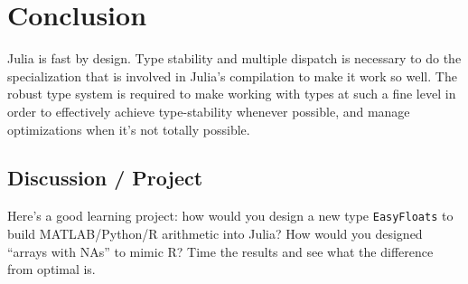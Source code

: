 \documentclass[11pt]{article}
\begin{document}
    \section{Conclusion}\label{conclusion}

Julia is fast by design. Type stability and multiple dispatch is
necessary to do the specialization that is involved in Julia's
compilation to make it work so well. The robust type system is required
to make working with types at such a fine level in order to effectively
achieve type-stability whenever possible, and manage optimizations when
it's not totally possible.

\subsection{Discussion / Project}\label{discussion-project}

Here's a good learning project: how would you design a new type
\texttt{EasyFloats} to build MATLAB/Python/R arithmetic into Julia? How
would you designed ``arrays with NAs'' to mimic R? Time the results and
see what the difference from optimal is.


    
    
    
    
\end{document}
